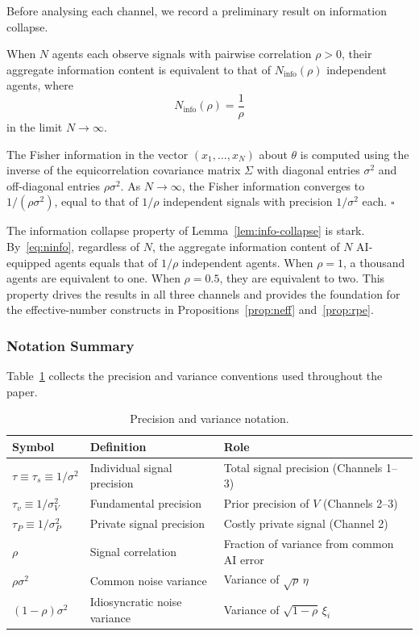Before analysing each channel, we record a preliminary result on information collapse.

\begin{lemma}\label{lem:info-collapse}
When $N$ agents each observe signals with pairwise correlation $\rho > 0$, their aggregate information content is equivalent to that of $N_{\text{info}}(\rho)$ independent agents, where
\begin{equation}\label{eq:ninfo}
  N_{\text{info}}(\rho) = \frac{1}{\rho}
\end{equation}
in the limit $N \to \infty$.

 The Fisher information in the vector $(x_1, \ldots, x_N)$ about $\theta$ is computed using the inverse of the equicorrelation covariance matrix $\Sigma$ with diagonal entries $\sigma^2$ and off-diagonal entries $\rho\sigma^2$. As $N \to \infty$, the Fisher information converges to $1/(\rho\sigma^2)$, equal to that of $1/\rho$ independent signals with precision $1/\sigma^2$ each. $\square$
\end{lemma}

The information collapse property of Lemma~\ref{lem:info-collapse} is stark. By~\eqref{eq:ninfo}, regardless of $N$, the aggregate information content of $N$ AI-equipped agents equals that of $1/\rho$ independent agents. When $\rho = 1$, a thousand agents are equivalent to one. When $\rho = 0.5$, they are equivalent to two. This property drives the results in all three channels and provides the foundation for the effective-number constructs in Propositions~\ref{prop:neff} and~\ref{prop:rpe}.

\subsubsection*{Notation Summary}

Table~\ref{tab:notation} collects the precision and variance conventions used throughout the paper.

\begin{table}[t]
\caption{Precision and variance notation.\label{tab:notation}}
\centering
\begin{tabular}{lll}
\hline
Symbol & Definition & Role \\
\hline
$\tau \equiv \tau_s \equiv 1/\sigma^2$ & Individual signal precision & Total signal precision (Channels 1--3) \\
$\tau_v \equiv 1/\sigma_V^2$ & Fundamental precision & Prior precision of $V$ (Channels 2--3) \\
$\tau_P \equiv 1/\sigma_P^2$ & Private signal precision & Costly private signal (Channel 2) \\
$\rho$ & Signal correlation & Fraction of variance from common AI error \\
$\rho\sigma^2$ & Common noise variance & Variance of $\sqrt{\rho}\,\eta$ \\
$(1-\rho)\sigma^2$ & Idiosyncratic noise variance & Variance of $\sqrt{1-\rho}\,\xi_i$ \\
\hline
\end{tabular}
\end{table}

